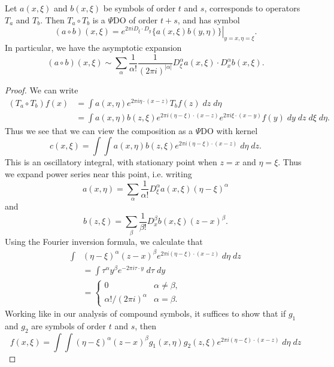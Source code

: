 \begin{theorem}
    Let $a(x,\xi)$ and $b(x,\xi)$ be symbols of order $t$ and $s$, corresponds to operators $T_a$ and $T_b$. Then $T_a \circ T_b$ is a $\Psi$DO of order $t + s$, and has symbol
    \[ (a \circ b)(x, \xi) = \left. e^{2 \pi i D_\xi \cdot D_y} \{ a(x,\xi) b(y,\eta) \} \right|_{y = x, \eta = \xi}. \]
    In particular, we have the asymptotic expansion
    \[ (a \circ b)(x,\xi) \sim \sum_\alpha \frac{1}{\alpha!} \frac{1}{(2 \pi i)^{|\alpha|}} D^\alpha_\xi a(x,\xi) \cdot D^\alpha_x b(x,\xi). \]
\end{theorem}
\begin{proof}
    We can write
    \begin{align*}
        (T_a \circ T_b) f(x) &= \int a(x,\eta) e^{2 \pi i \eta \cdot (x - z)} T_b f(z)\; dz\; d\eta\\
        &= \int a(x,\eta) b(z,\xi) e^{2 \pi i (\eta - \xi) \cdot (x - z)} e^{2 \pi i \xi \cdot (x - y)} f(y)\; dy\; dz\; d\xi\; d\eta.
    \end{align*}
    Thus we see that we can view the composition as a $\Psi$DO with kernel
    \[ c(x,\xi) = \int \int a(x,\eta) b(z,\xi) e^{2 \pi i (\eta - \xi) \cdot (x - z)}\; d\eta\; dz. \]
    This is an oscillatory integral, with stationary point when $z = x$ and $\eta = \xi$. Thus we expand power series near this point, i.e. writing
    \[ a(x,\eta) = \sum_\alpha \frac{1}{\alpha!} D^\alpha_\xi a(x,\xi) (\eta - \xi)^\alpha \]
    and
    \[ b(z,\xi) = \sum_\beta \frac{1}{\beta!} D^\beta_x b(x,\xi) (z - x)^\beta. \]
    Using the Fourier inversion formula, we calculate that
    \begin{align*}
        \int &(\eta - \xi)^\alpha (z - x)^\beta e^{2 \pi i (\eta - \xi) \cdot (x - z)}\; d\eta\; dz\\
        &= \int \tau^\alpha y^\beta e^{-2 \pi i \tau \cdot y}\; d\tau\; dy\\
        &= \begin{cases} 0 & \alpha \neq \beta, \\ \alpha! / (2 \pi i)^\alpha & \alpha = \beta. \end{cases}
    \end{align*}
    Working like in our analysis of compound symbols, it suffices to show that if $g_1$ and $g_2$ are symbols of order $t$ and $s$, then
    \[ f(x,\xi) = \int \int (\eta - \xi)^\alpha (z - x)^\beta g_1(x,\eta) g_2(z,\xi) e^{2 \pi i (\eta - \xi) \cdot (x - z)}\; d\eta\; dz \]

\end{proof}
